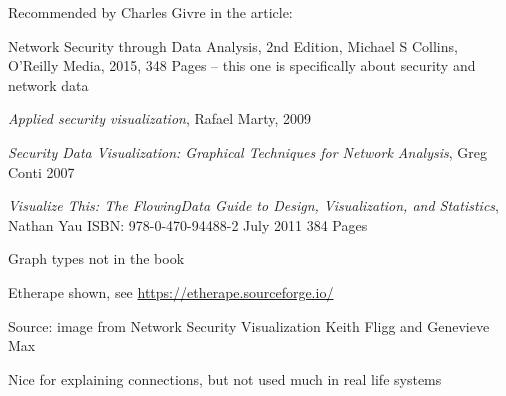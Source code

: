 \documentclass[Screen16to9,17pt]{foils}
\begin{document}
Recommended by Charles Givre in the article:\\




Network Security through Data Analysis, 2nd Edition, Michael S Collins,
O'Reilly Media, 2015, 348 Pages -- this one is specifically about security and network data

\begin{list2}
\item \emph{Applied security visualization}, Rafael Marty, 2009
\item \emph{Security Data Visualization: Graphical Techniques for Network Analysis}, Greg Conti 2007
\item \emph{Visualize This: The FlowingData Guide to Design, Visualization, and Statistics}, Nathan Yau
ISBN: 978-0-470-94488-2 July 2011 384 Pages
\end{list2}





\begin{list2}
  \item Graph types not in the book
  \item Etherape shown, see \url{https://etherape.sourceforge.io/}
\end{list2}



Source: image from Network Security Visualization Keith Fligg and Genevieve Max\\

\begin{list2}
\item {}
\item Nice for explaining connections, but not used much in real life systems
\end{list2}





\end{document}
